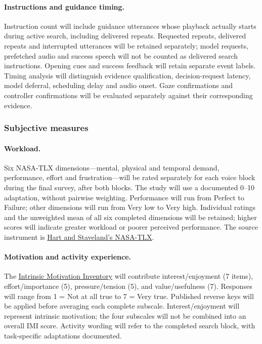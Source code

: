 \documentclass[11pt,letterpaper]{article}
\begin{document}
\paragraph{Instructions and guidance timing.} Instruction count will include guidance utterances whose playback actually starts during active search, including delivered repeats. Requested repeats, delivered repeats and interrupted utterances will be retained separately; model requests, prefetched audio and success speech will not be counted as delivered search instructions. Opening cues and success feedback will retain separate event labels. Timing analysis will distinguish evidence qualification, decision-request latency, model deferral, scheduling delay and audio onset. Gaze confirmations and controller confirmations will be evaluated separately against their corresponding evidence.

\subsubsection{Subjective measures}
\paragraph{Workload.} Six NASA-TLX dimensions---mental, physical and temporal demand, performance, effort and frustration---will be rated separately for each voice block during the final survey, after both blocks. The study will use a documented 0--10 adaptation, without pairwise weighting. Performance will run from Perfect to Failure; other dimensions will run from Very low to Very high. Individual ratings and the unweighted mean of all six completed dimensions will be retained; higher scores will indicate greater workload or poorer perceived performance. The source instrument is \href{https://doi.org/10.1016/S0166-4115(08)62386-9}{Hart and Staveland's NASA-TLX}.

\paragraph{Motivation and activity experience.} The \href{https://selfdeterminationtheory.org/intrinsic-motivation-inventory/}{Intrinsic Motivation Inventory} will contribute interest/enjoyment (7 items), effort/importance (5), pressure/tension (5), and value/usefulness (7). Responses will range from 1 = Not at all true to 7 = Very true. Published reverse keys will be applied before averaging each complete subscale. Interest/enjoyment will represent intrinsic motivation; the four subscales will not be combined into an overall IMI score. Activity wording will refer to the completed search block, with task-specific adaptations documented.
\end{document}
